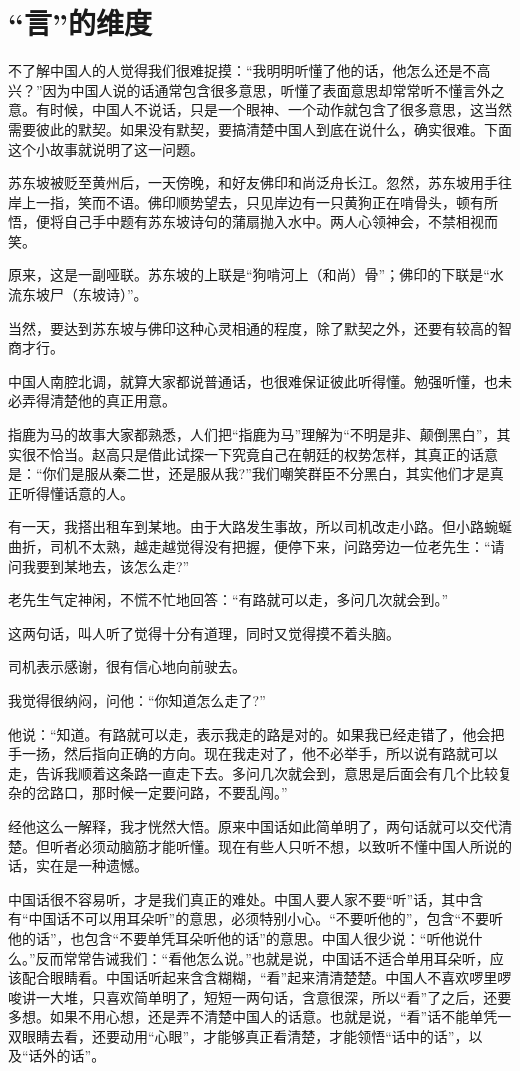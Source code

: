 \documentclass[fontset=fandol, a4paper, 12pt, openright]{ctexbook}
\begin{document}
\section{“言”的维度}

不了解中国人的人觉得我们很难捉摸：“我明明听懂了他的话，他怎么还是不高兴？”因为中国人说的话通常包含很多意思，听懂了表面意思却常常听不懂言外之意。有时候，中国人不说话，只是一个眼神、一个动作就包含了很多意思，这当然需要彼此的默契。如果没有默契，要搞清楚中国人到底在说什么，确实很难。下面这个小故事就说明了这一问题。

苏东坡被贬至黄州后，一天傍晚，和好友佛印和尚泛舟长江。忽然，苏东坡用手往岸上一指，笑而不语。佛印顺势望去，只见岸边有一只黄狗正在啃骨头，顿有所悟，便将自己手中题有苏东坡诗句的蒲扇抛入水中。两人心领神会，不禁相视而笑。

原来，这是一副哑联。苏东坡的上联是“狗啃河上（和尚）骨”；佛印的下联是“水流东坡尸（东坡诗）”。

当然，要达到苏东坡与佛印这种心灵相通的程度，除了默契之外，还要有较高的智商才行。

中国人南腔北调，就算大家都说普通话，也很难保证彼此听得懂。勉强听懂，也未必弄得清楚他的真正用意。

指鹿为马的故事大家都熟悉，人们把“指鹿为马”理解为“不明是非、颠倒黑白”，其实很不恰当。赵高只是借此试探一下究竟自己在朝廷的权势怎样，其真正的话意是：“你们是服从秦二世，还是服从我?”我们嘲笑群臣不分黑白，其实他们才是真正听得懂话意的人。

有一天，我搭出租车到某地。由于大路发生事故，所以司机改走小路。但小路蜿蜒曲折，司机不太熟，越走越觉得没有把握，便停下来，问路旁边一位老先生：“请问我要到某地去，该怎么走?”

老先生气定神闲，不慌不忙地回答：“有路就可以走，多问几次就会到。”

这两句话，叫人听了觉得十分有道理，同时又觉得摸不着头脑。

司机表示感谢，很有信心地向前驶去。

我觉得很纳闷，问他：“你知道怎么走了?”

他说：“知道。有路就可以走，表示我走的路是对的。如果我已经走错了，他会把手一扬，然后指向正确的方向。现在我走对了，他不必举手，所以说有路就可以走，告诉我顺着这条路一直走下去。多问几次就会到，意思是后面会有几个比较复杂的岔路口，那时候一定要问路，不要乱闯。”

经他这么一解释，我才恍然大悟。原来中国话如此简单明了，两句话就可以交代清楚。但听者必须动脑筋才能听懂。现在有些人只听不想，以致听不懂中国人所说的话，实在是一种遗憾。

中国话很不容易听，才是我们真正的难处。中国人要人家不要“听”话，其中含有“中国话不可以用耳朵听”的意思，必须特别小心。“不要听他的”，包含“不要听他的话”，也包含“不要单凭耳朵听他的话”的意思。中国人很少说：“听他说什么。”反而常常告诫我们：“看他怎么说。”也就是说，中国话不适合单用耳朵听，应该配合眼睛看。中国话听起来含含糊糊，“看”起来清清楚楚。中国人不喜欢啰里啰唆讲一大堆，只喜欢简单明了，短短一两句话，含意很深，所以“看”了之后，还要多想。如果不用心想，还是弄不清楚中国人的话意。也就是说，“看”话不能单凭一双眼睛去看，还要动用“心眼”，才能够真正看清楚，才能领悟“话中的话”，以及“话外的话”。
\end{document}
